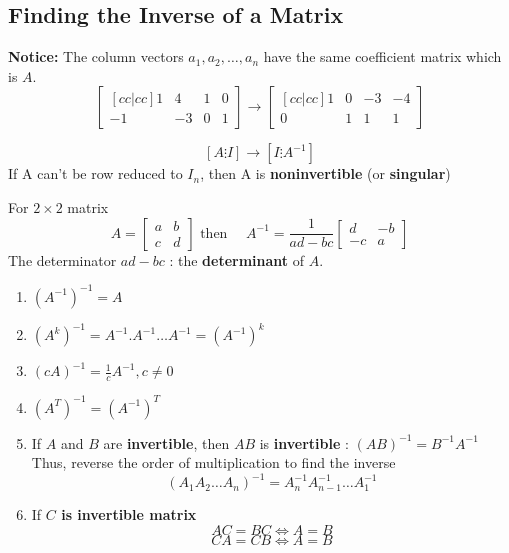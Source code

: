 \documentclass{article}
\newcommand\B{\textbf}
\newcommand\x{\times}
\begin{document}
    \subsection*{Finding the Inverse of a Matrix}

    \B{Notice: } The column vectors $a_1, a_2, \dots, a_n$ have the same coefficient matrix which is
    $A$. 
    \[ \begin{bmatrix}[cc|cc]
        1 & 4 & 1 & 0\\
        -1 & -3 & 0 & 1
    \end{bmatrix}
    \to \begin{bmatrix}[cc|cc]
        1 & 0 & -3 & -4 \\
        0 & 1 & 1 & 1
    \end{bmatrix}\]

    \[ [A \vdots I] \to [I \vdots A^{-1}]\]
    If A can't be row reduced to $I_n$, then A is \B{noninvertible} (or \B{singular})
    
    \begin{tcolorbox}
    For $2 \x 2$ matrix
    \[ A = \begin{bmatrix}
        a & b \\
        c & d
    \end{bmatrix} \text{ then  } \quad A^{-1} = \frac{1}{ad - bc} \begin{bmatrix}
        d & -b \\
        -c & a
    \end{bmatrix} \]
    The determinator $ad - bc$ : the \B{determinant} of $A$.
    \end{tcolorbox}
    

    \begin{tcolorbox}[width=\textwidth,colback={blue9}]    
       \begin{enumerate}
           \item  $(A^{-1})^{-1} = A$
           \item $(A^k)^{-1} = A^{-1}.A^{-1}\dots A^{-1} = (A^{-1})^k$
           \item $(cA)^{-1} = \frac{1}{c} A^{-1}, c \neq 0$
           \item $(A^T)^{-1} = (A^{-1})^{T}$
           \item If $A$ and $B$ are \B{invertible}, then $AB$ is \B{invertible} : $(AB)^{-1} = B^{-1}A^{-1}$ \\
               Thus, reverse the order of multiplication to find the inverse
               \[ (A_1A_2\dots A_n)^{-1} = A_n^{-1}A_{n-1}^{-1}\dots A_1^{-1}\]
           \item If \B{$C$ is invertible matrix} 
               \[ AC = BC \Leftrightarrow A = B \]
               \[ CA = CB \Leftrightarrow A = B \]  
       \end{enumerate} 
    \end{tcolorbox}   
\end{document}

